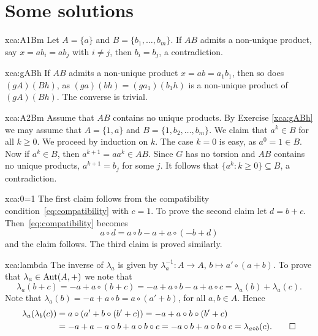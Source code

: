 \chapter*{Some solutions}

\pagestyle{plain}
\fancyhf{}
\fancyfoot[CE,CO]{\leftmark}
\fancyfoot[LE,RO]{\thepage}


\begin{sol}{xca:A1Bm}
    Let $A=\{a\}$ and $B=\{b_1,\dots,b_m\}$. 
    If $AB$ admits a non-unique product, say $x=ab_i=ab_j$ with $i\ne j$, 
    then $b_i=b_j$, a contradiction.
\end{sol}

\begin{sol}{xca:gABh}
    If $AB$ admits a non-unique product $x=ab=a_1b_1$, then so does $(gA)(Bh)$, as
    $(ga)(bh)=(ga_1)(b_1h)$ is a non-unique product of $(gA)(Bh)$. 
    The converse is trivial. 
\end{sol}

\begin{sol}{xca:A2Bm}
    Assume that $AB$ contains no unique products. 
    By Exercise \ref{xca:gABh} we may assume that $A=\{1,a\}$ and $B=\{1,b_2,\dots,b_m\}$. 
    We claim that $a^k\in B$ for all $k\geq0$. We proceed by induction on $k$. The case
    $k=0$ is easy, as $a^0=1\in B$. Now if $a^k\in B$, then $a^{k+1}=aa^{k}\in AB$. Since $G$ has no torsion and 
    $AB$ contains no unique products, 
    $a^{k+1}=b_j$ for some $j$. It follows that $\{a^k:k\geq0\}\subseteq B$, a contradiction. 
\end{sol}

\begin{sol}{xca:0=1}
The first claim follows from the compatibility condition~\eqref{eq:compatibility} with
$c=1$.  To prove the second claim let $d=b+c$.
Then~\eqref{eq:compatibility} becomes 
\[
	a\circ d =a\circ b-a+a\circ (-b+d)
\]
and the claim follows. The third claim is
proved similarly.
\end{sol}

\begin{sol}{xca:lambda}
The inverse of $\lambda_a$ is given by $\lambda^{-1}_a\colon A\to A$, $b\mapsto a'\circ (a+b)$. To prove
that $\lambda_a\in\operatorname{Aut}(A,+)$ we note that
\[
\lambda_a(b+c)=-a+a\circ(b+c)=-a+a\circ b-a+a\circ c=\lambda_a(b)+\lambda_a(c).
\]
Note that $\lambda_a(b)=-a+a\circ b=a\circ (a'+b)$, for all $a,b\in A$. Hence 
\begin{align*}
\lambda_a(\lambda_b(c))&=a\circ (a'+b\circ (b'+c))=-a+a\circ b\circ (b'+c)\\
&=-a+a-a\circ b+a\circ b\circ c=-a\circ b+a\circ b\circ c=\lambda_{a\circ b}(c).\qedhere    
\end{align*}
\end{sol}


